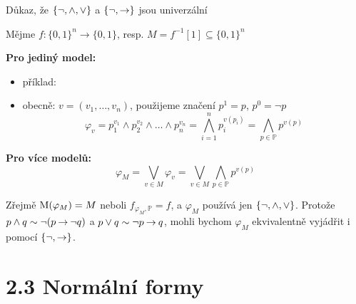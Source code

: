\documentclass{beamer}
\begin{document}
\begin{frame}{Důkaz, že $\{\neg, {\land},{\lor}\}$ a $\{\neg, {\mathbin{\rightarrow}}\}$ jsou univerzální}  

    \pause
    Mějme $f\colon \{0,1\}^n\to \{0,1\}$, resp. $M=f^{-1}[1]\subseteq \{0,1\}^n$
 
    \pause
    \textbf{Pro jediný model:} 

    \pause
    \begin{itemize}
        \item příklad: 
        \item obecně: $v=(v_1,\dots,v_n)$, použijeme značení $p^1=p$, $p^0=\neg p$
        $$
        \varphi_v = p_1^{v_1}\land p_2^{v_2}\land \dots\land p_n^{v_n}=\bigwedge_{i=1}^n p_i^{v(p_i)}=\bigwedge_{p\in\mathbb P}p^{v(p)}
        $$    
    \end{itemize}
    
    \pause
    \textbf{Pro více modelů:} 
    \pause
    $$
    \varphi_M = \bigvee_{v\in M}\varphi_v=\bigvee_{v\in M}\bigwedge_{p\in\mathbb P}p^{v(p)}
    $$

    \pause
    Zřejmě $\operatorname{M}(\varphi_M)=M$ neboli $f_{\varphi_M,\mathbb P}=f$, a $\varphi_M$ používá jen $\{\neg, {\land},{\lor}\}$. Protože $p\land q\sim \neg (p\mathbin{\rightarrow} \neg q)$ a $p\lor q\sim \neg p\mathbin{\rightarrow} q$, mohli bychom $\varphi_M$ ekvivalentně vyjádřit i pomocí  $\{\neg, {\mathbin{\rightarrow}}\}$. \hfill\qedsymbol   

\end{frame}


\section{2.3 Normální formy}
\end{document}
